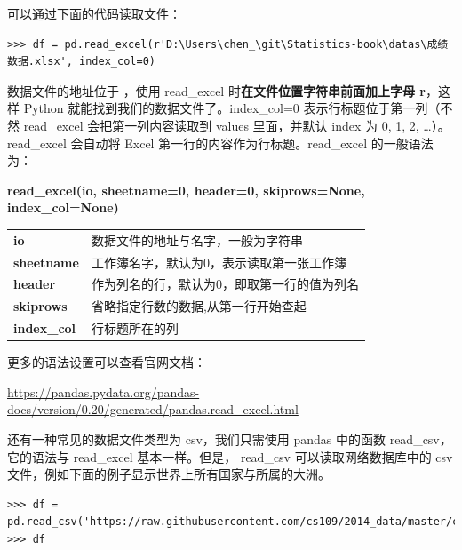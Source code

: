 可以通过下面的代码读取文件：

\begin{lstlisting}[Language=Python]
>>> df = pd.read_excel(r'D:\Users\chen_\git\Statistics-book\datas\成绩数据.xlsx', index_col=0)
\end{lstlisting}

数据文件的地址位于 ，使用 read\_excel 时\textbf{在文件位置字符串前面加上字母 r}，这样 Python 就能找到我们的数据文件了。index\_col=0 表示行标题位于第一列（不然 read\_excel 会把第一列内容读取到 values 里面，并默认 index 为 0, 1, 2, \dots）。read\_excel 会自动将 Excel 第一行的内容作为行标题。read\_excel 的一般语法为：

\begin{center}
\begin{tcolorbox}[title = read\_excel 函数的语法]
\textbf{read\_excel(io, sheetname=0, header=0, skiprows=None,  index\_col=None)}
\tcblower
\vspace{10pt}

\begin{tcboutputlisting}
\begin{tabular}{>{\bfseries}ll}
  io &数据文件的地址与名字，一般为字符串\\
  sheetname & 工作簿名字，默认为0，表示读取第一张工作簿\\
header &作为列名的行，默认为0，即取第一行的值为列名\\
skiprows&省略指定行数的数据,从第一行开始查起\\
index\_col&行标题所在的列\\
\end{tabular}
\end{tcboutputlisting}
\tcbuselistingtext

\end{tcolorbox}
\end{center}

\sloppy
更多的语法设置可以查看官网文档：

\href{https://pandas.pydata.org/pandas-docs/version/0.20/generated/pandas.read\_excel.html}{https://pandas.pydata.org/pandas-docs/version/0.20/generated/pandas.read\_excel.html}

还有一种常见的数据文件类型为 csv，我们只需使用 pandas 中的函数 read\_csv，它的语法与 read\_excel 基本一样。但是， read\_csv 可以读取网络数据库中的 csv 文件，例如下面的例子显示世界上所有国家与所属的大洲。

\begin{lstlisting}[Language=Python]
>>> df = pd.read_csv('https://raw.githubusercontent.com/cs109/2014_data/master/countries.csv')
>>> df
\end{lstlisting}

